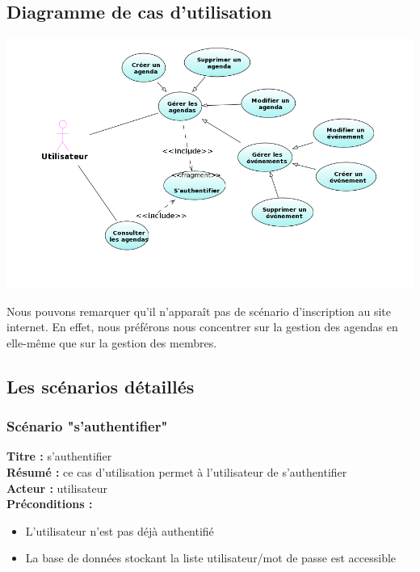 \documentclass[12pt , a4paper]{article}
\begin{document}
\subsection{Diagramme de cas d'utilisation}
	\begin{center}
	  \includegraphics[scale=0.6]{./images/use_cases.png}
	\end{center}
\noindent Nous pouvons remarquer qu'il  n'apparaît pas de scénario d'inscription au site internet. En effet,  nous préférons nous concentrer sur la gestion des agendas  en elle-même que sur la gestion
des membres.

\subsection{Les scénarios détaillés}
\subsubsection{Scénario "s'authentifier"}

\noindent\textbf{Titre : } s'authentifier\\
\textbf{Résumé : } ce cas d'utilisation permet à l'utilisateur de s'authentifier\\
\textbf{Acteur : }utilisateur\\

\noindent\textbf{Préconditions :}
\begin{itemize}
\item L'utilisateur n'est pas déjà authentifié
\item La base de données stockant la liste utilisateur/mot de passe est accessible \\
\end{itemize}
\end{document}
